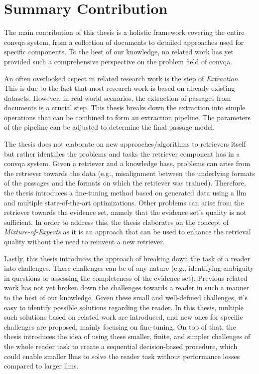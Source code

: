 \section{Summary Contribution}
\label{sec:conclusion_contribution}

The main contribution of this thesis is a holistic framework covering the entire \gls{convqa} system, from a collection of documents to detailed approaches used for specific components. To the best of our knowledge, no related work has yet provided such a comprehensive perspective on the problem field of \gls{convqa}.

An often overlooked aspect in related research work is the step of \textit{Extraction}. This is due to the fact that most research work is based on already existing datasets. However, in real-world scenarios, the extraction of passages from documents is a crucial step. This thesis breaks down the extraction into simple operations that can be combined to form an extraction pipeline. The parameters of the pipeline can be adjusted to determine the final passage model.

The thesis does not elaborate on new approaches/algorithms to retrievers itself but rather identifies the problems and tasks the retriever component has in a \gls{convqa} system. Given a retriever and a knowledge base, problems can arise from the retriever towards the data (e.g., misalignment between the underlying formats of the passages and the formats on which the retriever was trained). Therefore, the thesis introduces a fine-tuning method based on generated data using a \gls{llm} and multiple state-of-the-art optimizations. Other problems can arise from the retriever towards the evidence set, namely that the evidence set's quality is not sufficient. In order to address this, the thesis elaborates on the concept of \textit{Mixture-of-Experts} as it is an approach that can be used to enhance the retrieval quality without the need to reinvent a new retriever.

Lastly, this thesis introduces the approach of breaking down the task of a reader into challenges. These challenges can be of any nature (e.g., identifying ambiguity in questions or assessing the completeness of the evidence set). Previous related work has not yet broken down the challenges towards a reader in such a manner to the best of our knowledge. Given these small and well-defined challenges, it's easy to identify possible solutions regarding the reader. In this thesis, multiple such solutions based on related work are introduced, and new ones for specific challenges are proposed, mainly focusing on fine-tuning. On top of that, the thesis introduces the idea of using these smaller, finite, and simpler challenges of the whole reader task to create a sequential decision-based procedure, which could enable smaller \gls{llm}s to solve the reader task without performance losses compared to larger \gls{llm}s.


